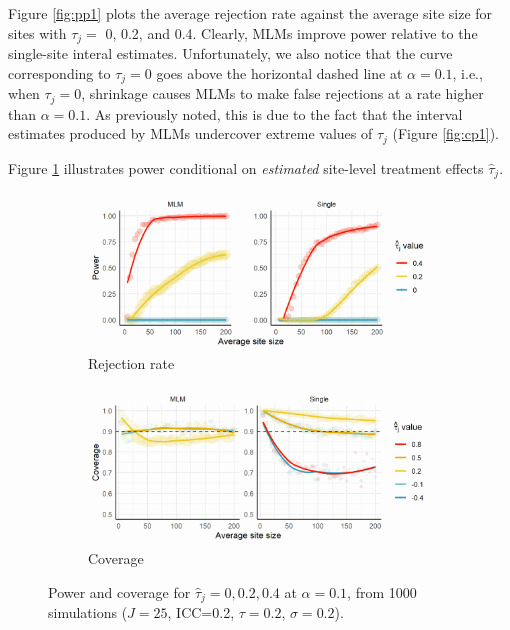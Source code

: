 \documentclass[]{article}
\begin{document}
Figure \ref{fig:pp1} plots the average rejection rate against the average site size for sites with $\tau_j =$ 0, 0.2, and 0.4.
Clearly, MLMs improve power relative to the single-site interal estimates.
Unfortunately, we also notice that the curve corresponding to $\tau_j = 0$ goes above the horizontal dashed line at $\alpha=0.1$, i.e., when $\tau_j = 0$, shrinkage causes MLMs to make false rejections at a rate higher than $\alpha=0.1$.
As previously noted, this is due to the fact that the interval estimates produced by MLMs undercover extreme values of $\tau_j$ (Figure \ref{fig:cp1}).

Figure \ref{fig:pp2} illustrates power conditional on \textit{estimated} site-level treatment effects $\hat{\tau}_j$.
\begin{figure}[ht]
    \centering
    \begin{subfigure}[a]{\textwidth}
    	\includegraphics[width=\textwidth]{pp2}
        \caption{Rejection rate}
    	\label{fig:pp2}
    \end{subfigure}
    \vfill
    \begin{subfigure}[b]{\textwidth}
    	\includegraphics[width=\textwidth]{cp2}
        \caption{Coverage}
    	\label{fig:cp2}
    \end{subfigure}
    \caption{Power and coverage for $\hat{\tau}_j = 0, 0.2, 0.4$ at $\alpha=0.1$, from 1000 simulations ($J=25$, ICC=0.2, $\tau=0.2$, $\sigma=0.2$).}
    \label{fig:pcp2}
\end{figure}
\end{document}
